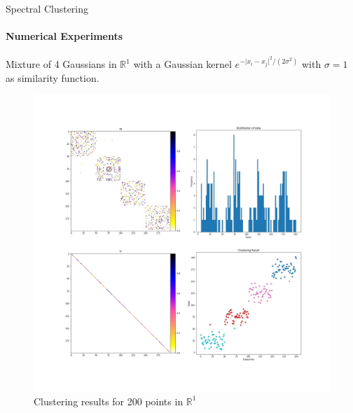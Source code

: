 \documentclass[10pt,a4paper, nocenter]{beamer}
\begin{document}
	\begin{frame}{Spectral Clustering}
		\framesubtitle{Numerical Experiments}
		Mixture of 4 Gaussians in $\mathbb{R}^1$ with a Gaussian kernel $e^{-\lvert x_i - x_j \rvert^2/(2\sigma^2)}$ with $\sigma = 1$ as similarity function.
		\begin{figure}[h]
			\includegraphics[height=0.6\textheight]{../../images/1DCluster.jpg}
			\caption{Clustering results for 200 points in $\mathbb{R}^1$}
			\label{fig:1dresults}
		\end{figure}
	\end{frame}
\end{document}
